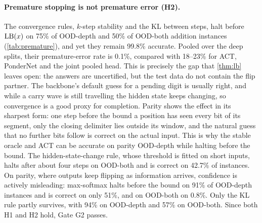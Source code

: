 \paragraph{Premature stopping is not premature error (H2).} The convergence rules, $k$-step stability
and the KL between steps, halt before $\LB(x)$ on 75\% of OOD-depth and 50\% of OOD-both addition
instances (\cref{tab:premature}), and yet they remain 99.8\% accurate. Pooled over the deep splits,
their premature-error rate is 0.1\%, compared with 18--23\% for ACT, PonderNet and the joint pooled head.
This is precisely the gap that \cref{thm:lb} leaves open: the answers are uncertified, but the test data
do not contain the flip partner. The backbone's default guess for a pending digit is usually right, and
while a carry wave is still travelling the hidden state keeps changing, so convergence is a good proxy
for completion. Parity shows the effect in its sharpest form: one step before the bound a position has
seen every bit of its segment, only the closing delimiter lies outside its window, and the natural
guess that no further bits follow is correct on the actual input. This is why the stable oracle and ACT
can be accurate on parity OOD-depth while halting before the bound. The hidden-state-change rule, whose threshold is fitted on short inputs,
halts after about four steps on OOD-both and is correct on 42.7\% of instances. On parity, where outputs
keep flipping as information arrives, confidence is actively misleading: max-softmax halts before the
bound on 91\% of OOD-depth instances and is correct on only 51\%, and on OOD-both on 0.8\%. Only the KL
rule partly survives, with 94\% on OOD-depth and 57\% on OOD-both. Since both H1 and H2 hold, Gate G2
passes.

\begin{table}[t]
  \centering
  \caption{Premature-stop rate PS (\%), the fraction of instances halted before the light-cone bound
  $\LB(x)$. Such answers are uncertified (\cref{thm:lb}), though not necessarily wrong.}
  \label{tab:premature}
  \scriptsize
  \setlength{\tabcolsep}{3pt}
  \resizebox{\linewidth}{!}{}
\end{table}

